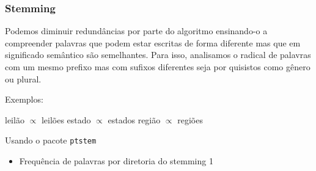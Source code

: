 \documentclass[]{article}
\newenvironment{Shaded}{\begin{snugshade}}{\end{snugshade}}
\newcommand{\CommentTok}[1]{\textcolor[rgb]{0.56,0.35,0.01}{\textit{#1}}}
\newcommand{\DataTypeTok}[1]{\textcolor[rgb]{0.13,0.29,0.53}{#1}}
\newcommand{\KeywordTok}[1]{\textcolor[rgb]{0.13,0.29,0.53}{\textbf{#1}}}
\newcommand{\NormalTok}[1]{#1}
\newcommand{\OperatorTok}[1]{\textcolor[rgb]{0.81,0.36,0.00}{\textbf{#1}}}
\newcommand{\OtherTok}[1]{\textcolor[rgb]{0.56,0.35,0.01}{#1}}
\newcommand{\StringTok}[1]{\textcolor[rgb]{0.31,0.60,0.02}{#1}}
\providecommand{\tightlist}{%
  \setlength{\itemsep}{0pt}\setlength{\parskip}{0pt}}
\begin{document}
\begin{Shaded}
\end{Shaded}

\hypertarget{stemming}{%
\subsubsection{Stemming}\label{stemming}}

Podemos diminuir redundâncias por parte do algoritmo ensinando-o a
compreender palavras que podem estar escritas de forma diferente mas que
em significado semântico são semelhantes. Para isso, analisamos o
radical de palavras com um mesmo prefixo mas com sufixos diferentes seja
por quisistos como gênero ou plural.

Exemplos:

leilão \(\propto\) leilões estado \(\propto\) estados região \(\propto\)
regiões

Usando o pacote \texttt{ptstem}

\begin{Shaded}
\end{Shaded}

\begin{itemize}
\tightlist
\item
  Frequência de palavras por diretoria do stemming 1
\end{itemize}

\begin{Shaded}
\end{Shaded}
\end{document}
